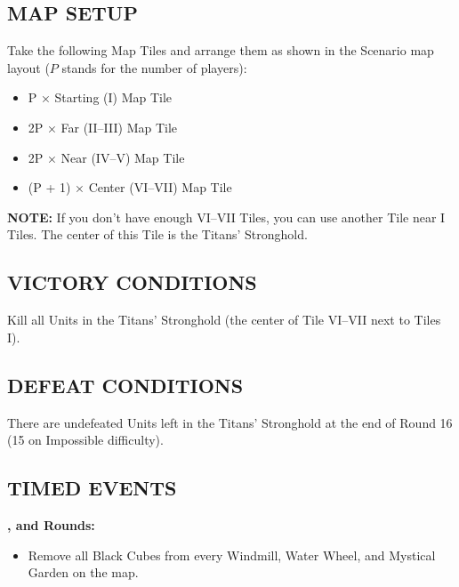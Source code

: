 \begin{multicols*}{2}
\vspace*{\fill}\columnbreak

\subsection*{\MakeUppercase{Map Setup}}

Take the following Map Tiles and arrange them as shown in the Scenario map layout ($P$ stands for the number of players):

\begin{itemize}
  \item P × Starting (I) Map Tile
  \item 2P × Far (II--III) Map Tile
  \item 2P × Near (IV--V) Map Tile
  \item (P + 1) × Center (VI--VII) Map Tile
\end{itemize}

\textbf{\MakeUppercase{Note:}} If you don’t have enough VI--VII Tiles, you can
use another Tile near I Tiles. The center of this
Tile is the Titans’ Stronghold.

\subsection*{\MakeUppercase{Victory Conditions}}

Kill all Units in the Titans' Stronghold (the center of Tile VI--VII next to Tiles I).

\subsection*{\MakeUppercase{Defeat Conditions}}

There are undefeated Units left in the Titans' Stronghold at the end of Round 16 (15 on Impossible difficulty).


\subsection*{\MakeUppercase{Timed Events}}

\textbf{,  and  Rounds:}
\begin{itemize}
  \item Remove all Black Cubes from every Windmill, Water Wheel, and Mystical Garden on the map.
\end{itemize}


\end{multicols*}
